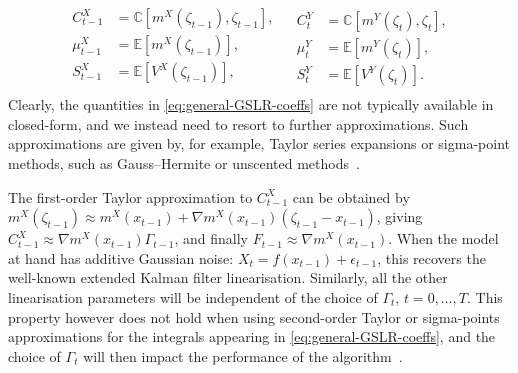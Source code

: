 \begin{align}
    \label{eq:general-GSLR-coeffs}
    \begin{split}
        C^X_{t-1} &= \mathbb{C}\left[m^X(\zeta_{t-1}), \zeta_{t-1}\right], \\
        \mu^X_{t-1} &= \mathbb{E}\left[m^X(\zeta_{t-1})\right], \\
        S^X_{t-1} &= \mathbb{E}\left[V^X(\zeta_{t-1})\right],\\
    \end{split}
    &
    \begin{split}
        C^Y_t &= \mathbb{C}\left[m^Y(\zeta_{t}), \zeta_{t}\right], \\
        \mu^Y_t &= \mathbb{E}\left[m^Y(\zeta_{t})\right], \\
        S^Y_t &= \mathbb{E}\left[V^Y(\zeta_{t})\right].
    \end{split}
\end{align}
Clearly, the quantities in \eqref{eq:general-GSLR-coeffs} are not typically available in closed-form, and we instead need to resort to further approximations. Such approximations are given by, for example, Taylor series expansions or sigma-point methods, such as Gauss--Hermite or unscented methods~\citep[see, e.g.,][Ch. 5]{sarkka2013bayesian}.

\begin{example}
    \label{eq:gslr-example}
    The first-order Taylor approximation to  $C^X_{t-1}$ can be obtained by $m^X(\zeta_{t-1}) \approx m^X(x_{t-1}) + \nabla m^X(x_{t-1})(\zeta_{t-1} - x_{t-1})$, giving $C^X_{t-1} \approx \nabla m^X(x_{t-1}) \Gamma_{t-1}$, and finally $F_{t-1} \approx \nabla m^X(x_{t-1})$. When the model at hand has additive Gaussian noise: $X_t = f(x_{t-1}) + \epsilon_{t-1}$, this recovers the well-known extended Kalman filter linearisation. Similarly, all the other linearisation parameters will be independent of the choice of $\Gamma_t$, $t=0, \ldots, T$. This property however does not hold when using second-order Taylor or sigma-points approximations for the integrals appearing in \eqref{eq:general-GSLR-coeffs}, and the choice of $\Gamma_t$ will then impact the performance of the algorithm~\citep[see, e.g.,][Ch. 5-6, for the role of the reference covariance in classical Gaussian approximated filtering and smoothing]{sarkka2013bayesian}.
\end{example}

